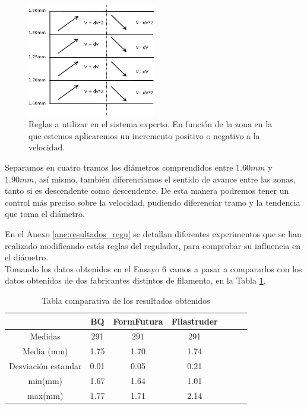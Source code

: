\begin{figure}[H]
    \centering
    \includegraphics[width=0.5\textwidth]{images/producciones/11082015/Diagram1.png}
    \caption[Reglas a utilizar en el sistema experto.]{Reglas a utilizar en el sistema experto. En función de la zona en la que estemos aplicaremos un incremento positivo o negativo a la velocidad.}
    \label{fig:reg_reglas}
\end{figure}

Separamos en cuatro tramos los diámetros comprendidos entre $1.60mm$ y $1.90mm$, así mismo, también diferenciamos el sentido de avance entre las zonas, tanto si es descendente como descendente. De esta manera podremos tener un control más preciso sobre la velocidad, pudiendo diferenciar tramo y la tendencia que toma el diámetro.

En el Anexo \ref{ane:resultados_regu} se detallan diferentes experimentos que se han realizado modificando estás reglas del regulador, para comprobar su influencia en el diámetro.\\

Tomando los datos obtenidos en el Ensayo 6  vamos a pasar a compararlos con los datos obtenidos de dos fabricantes distintos de filamento, en la Tabla \ref{tab:compara_results}.

\begin{table}[H]
	\centering
	\begin{tabular}{ccccccc}
		                    & BQ & FormFutura & Filastruder \\ \hline
		Medidas             & 291      &291       & 291      \\
		Media (mm)          & 1.75     & 1.70     & 1.74      \\
		Desviación estandar & 0.01     & 0.05     & 0.21      \\
		min(mm)             & 1.67     & 1.64     & 1.01      \\
		max(mm)             & 1.77     & 1.71     & 2.14     
	\end{tabular}
	\caption{Tabla comparativa de los resultados obtenidos}
	\label{tab:compara_results}
\end{table}

